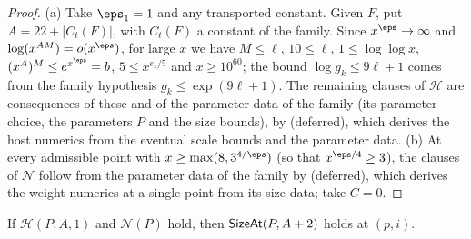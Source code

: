 \begin{proof}
(a) Take $\eps_1=1$ and any transported constant. Given $F$, put $A=22+|C_t(F)|$, with $C_t(F)$ a constant of the
family. Since $x^{\eps}\to\infty$ and $\log(x^{AM})=o(x^\eps)$, for large $x$ we have $M\le\ell$, $10\le\ell$,
$1\le\log\log x$, $(x^A)^M\le e^{x^\eps}=b$, $5\le x^{e_z/5}$ and $x\ge10^{60}$; the bound $\log g_k\le9\ell+1$ comes
from the family hypothesis $g_k\le\exp(9\ell+1)$. The remaining clauses of $\mathcal H$ are consequences of these and
of the parameter data of the family (its parameter choice, the parameters $P$ and the size bounds), by
 (deferred), which derives the host numerics from the
eventual scale bounds and the parameter data.
(b) At every admissible point with $x\ge\max(8,3^{4/\eps})$ (so that $x^{\eps/4}\ge3$), the clauses of $\mathcal N$
follow from the parameter data of the family by  (deferred), which
derives the weight numerics at a single point from its size data; take $C=0$.
\end{proof}

\begin{lemma}\label{pf:lift2:sizeat}
If $\mathcal H(P,A,1)$ and $\mathcal N(P)$ hold, then $\mathsf{SizeAt}(P,A+2)$ holds at $(p,i)$.
\end{lemma}

